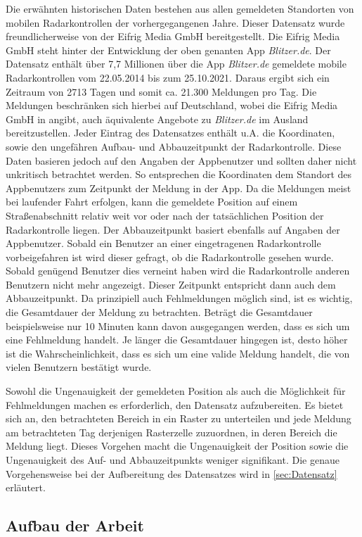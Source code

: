 Die erwähnten historischen Daten bestehen aus allen gemeldeten Standorten von mobilen Radarkontrollen der vorhergegangenen Jahre.
Dieser Datensatz wurde freundlicherweise von der Eifrig Media GmbH bereitgestellt.
Die Eifrig Media GmbH steht hinter der Entwicklung der oben genanten App \emph{Blitzer.de}.
Der Datensatz enthält über 7,7 Millionen über die App \emph{Blitzer.de} gemeldete mobile Radarkontrollen vom 22.05.2014 bis zum 25.10.2021.
Daraus ergibt sich ein Zeitraum von 2713 Tagen und somit ca. 21.300 Meldungen pro Tag.
Die Meldungen beschränken sich hierbei auf Deutschland, wobei die Eifrig Media GmbH in \cite{AboutBlitzerDe} angibt, auch äquivalente Angebote zu \emph{Blitzer.de} im Ausland bereitzustellen.
Jeder Eintrag des Datensatzes enthält u.A. die Koordinaten, sowie den ungefähren Aufbau- und Abbauzeitpunkt der Radarkontrolle.
Diese Daten basieren jedoch auf den Angaben der Appbenutzer und sollten daher nicht unkritisch betrachtet werden.
So entsprechen die Koordinaten dem Standort des Appbenutzers zum Zeitpunkt der Meldung in der App.
Da die Meldungen meist bei laufender Fahrt erfolgen, kann die gemeldete Position auf einem Straßenabschnitt relativ weit vor oder nach der tatsächlichen Position der Radarkontrolle liegen.
Der Abbauzeitpunkt basiert ebenfalls auf Angaben der Appbenutzer.
Sobald ein Benutzer an einer eingetragenen Radarkontrolle vorbeigefahren ist wird dieser gefragt, ob die Radarkontrolle gesehen wurde.
Sobald genügend Benutzer dies verneint haben wird die Radarkontrolle anderen Benutzern nicht mehr angezeigt.
Dieser Zeitpunkt entspricht dann auch dem Abbauzeitpunkt.
Da prinzipiell auch Fehlmeldungen möglich sind, ist es wichtig, die Gesamtdauer der Meldung zu betrachten.
Beträgt die Gesamtdauer beispielsweise nur 10 Minuten kann davon ausgegangen werden, dass es sich um eine Fehlmeldung handelt.
Je länger die Gesamtdauer hingegen ist, desto höher ist die Wahrscheinlichkeit, dass es sich um eine valide Meldung handelt, die von vielen Benutzern bestätigt wurde.

Sowohl die Ungenauigkeit der gemeldeten Position als auch die Möglichkeit für Fehlmeldungen machen es erforderlich, den Datensatz aufzubereiten.
Es bietet sich an, den betrachteten Bereich in ein Raster zu unterteilen und jede Meldung am betrachteten Tag derjenigen Rasterzelle zuzuordnen, in deren Bereich die Meldung liegt.
Dieses Vorgehen macht die Ungenauigkeit der Position sowie die Ungenauigkeit des Auf- und Abbauzeitpunkts weniger signifikant.
Die genaue Vorgehensweise bei der Aufbereitung des Datensatzes wird in \autoref{sec:Datensatz} erläutert.

\subsection{Aufbau der Arbeit}
\label{sec:Aufbau}


